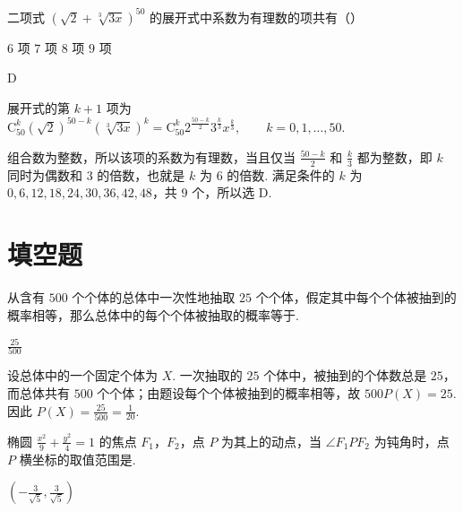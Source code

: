 \begin{problem}
二项式 \(\left(\sqrt{2} + \sqrt[3]{3x}\right)^{50}\) 的展开式中系数为有理数的项共有（\quad）

\choices
    {\(6\) 项}
    {\(7\) 项}
    {\(8\) 项}
    {\(9\) 项}
\end{problem}

\begin{answer}
D
\end{answer}

\begin{solution}
展开式的第 \(k+1\) 项为
\(
\mathrm C_{50}^{k}(\sqrt{2})^{50-k}(\sqrt[3]{3x})^{k}
=\mathrm C_{50}^{k}2^{\frac{50-k}{2}}3^{\frac{k}{3}}x^{\frac{k}{3}},\qquad k=0,1,\ldots,50.
\)

组合数为整数，所以该项的系数为有理数，当且仅当 \(\frac{50-k}{2}\) 和 \(\frac{k}{3}\) 都为整数，即 \(k\) 同时为偶数和 \(3\) 的倍数，也就是 \(k\) 为 \(6\) 的倍数. 满足条件的 \(k\) 为
\(
0,6,12,18,24,30,36,42,48
\)，共 \(9\) 个，所以选 D.
\end{solution}

\section{填空题}
\begin{problem}
从含有 \(500\) 个个体的总体中一次性地抽取 \(25\) 个个体，假定其中每个个体被抽到的概率相等，那么总体中的每个个体被抽取的概率等于\fillinblank{}.
\end{problem}

\begin{answer}
\(\frac{25}{500}\)
\end{answer}

\begin{solution}
设总体中的一个固定个体为 \(X\). 一次抽取的 \(25\) 个体中，被抽到的个体数总是 \(25\)，而总体共有 \(500\) 个个体；由题设每个个体被抽到的概率相等，故
\(
500P(X)=25
\).
因此
\(
P(X)=\frac{25}{500}=\frac{1}{20}
\).
\end{solution}

\begin{problem}
椭圆 \(\frac{x^2}{9} + \frac{y^2}{4} = 1\) 的焦点 \(F_1\)，\(F_2\)，点 \(P\) 为其上的动点，当 \(\angle F_1PF_2\) 为钝角时，点 \(P\) 横坐标的取值范围是\fillinblank{}.
\end{problem}

\begin{answer}
\(\left(-\frac{3}{\sqrt{5}},\frac{3}{\sqrt{5}}\right)\)
\end{answer}


